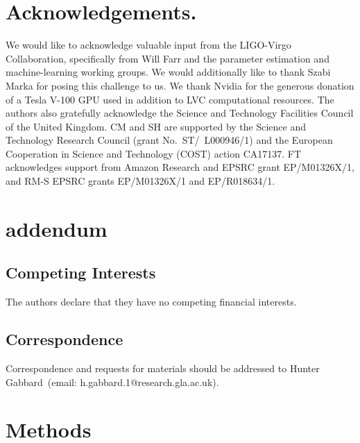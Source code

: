 \documentclass[%
showpacs,
 amsmath,amssymb,
 aps,
 twocolumn,
 prl,
 reprint,
floatfix,
]{revtex4-1}
\begin{document}
%
%
\section{Acknowledgements.}
%
We would like to acknowledge valuable input from the LIGO-Virgo Collaboration,
specifically from Will Farr and the parameter estimation and machine-learning
working groups. We would additionally like to thank Szabi Marka for posing this
challenge to us. We thank Nvidia for the generous donation of a Tesla V-100 GPU
used in addition to \ac{LVC} computational resources. The authors also
gratefully acknowledge the Science and Technology Facilities Council of the
United Kingdom. CM and SH are supported by the Science and Technology Research
Council (grant No.~ST/~L000946/1) and the European Cooperation in Science and
Technology (COST) action CA17137. FT acknowledges support from Amazon Research and 
EPSRC grant EP/M01326X/1, and RM-S EPSRC grants EP/M01326X/1 and EP/R018634/1. 

%
%



\section{addendum}
 \subsection{Competing Interests} 
    The authors declare that they have no competing financial interests.
 \subsection{Correspondence} Correspondence and requests for materials should be addressed to Hunter Gabbard~(email: h.gabbard.1@research.gla.ac.uk).

%
%
\section{Methods}\label{sec:methods}
%
\end{document}
